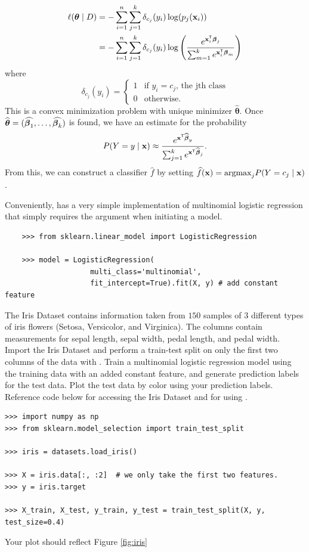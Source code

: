 \begin{align*}
    \ell(\boldsymbol{\theta}\mid D) 
    & = - \sum_{i=1}^n \sum_{j = 1}^k \delta_{c_j} (y_i) \log (p_j(\mathbf{x}_i)) \\
    & = - \sum_{i=1}^n \sum_{j = 1}^k \delta_{c_j} (y_i) \log \left(  \frac{e^{\mathbf{x}_i^\mathsf{T}\boldsymbol\beta_j}}{\sum_{m=1}^k e^{\mathbf{x}_i^\mathsf{T}\boldsymbol\beta_m}} \right)
\end{align*}
where 
\[
    \delta_{c_j} (y_i) = \begin{cases}
    1 & \text{if $y_i = c_j$, the jth class}\\
    0 & \text{otherwise}. 
    \end{cases}
\]
This is a convex minimization problem with unique minimizer $\widehat{\boldsymbol{\theta}}$.
Once $\widehat{\boldsymbol{\theta}} = (\widehat{\boldsymbol\beta_1},\dots, \widehat{\boldsymbol\beta_k})$ is found, we have an estimate for the probability
\[
    P(Y=y \mid \mathbf{x}) \approx \frac{e^{\mathbf{x}^\mathsf{T} \widehat{\boldsymbol\beta}_y}}{\sum_{j=1}^k e^{\mathbf{x}^\mathsf{T} \widehat{\boldsymbol\beta}_j}}.
\]
From this, we can construct a classifier $\widehat{f}$ by setting $\widehat{f}(\mathbf{x}) = \text{argmax}_j P(Y=c_j \mid \mathbf{x}) $.  

Conveniently,  has a very simple implementation of multinomial logistic regression that simply requires the argument  when initiating a  model.
\begin{lstlisting}
    >>> from sklearn.linear_model import LogisticRegression

    >>> model = LogisticRegression(
                    multi_class='multinomial',
                    fit_intercept=True).fit(X, y) # add constant feature
\end{lstlisting}


\begin{problem}
    The Iris Dataset contains information taken from $150$ samples of $3$ different types of iris flowers (Setosa, Versicolor, and Virginica).
    The columns contain measurements for sepal length, sepal width, pedal length, and pedal width.
    Import the Iris Dataset and perform a train-test split on only the first two columns of the data with .
    Train a multinomial logistic regression model using the training data with an added constant feature, and generate prediction labels for the test data.
    Plot the test data by color using your prediction labels.
    Reference code below for accessing the Iris Dataset and for using .
\begin{lstlisting}
>>> import numpy as np
>>> from sklearn.model_selection import train_test_split

>>> iris = datasets.load_iris()

>>> X = iris.data[:, :2]  # we only take the first two features.
>>> y = iris.target

>>> X_train, X_test, y_train, y_test = train_test_split(X, y, test_size=0.4)
\end{lstlisting}
    Your plot should reflect Figure \ref{fig:iris}
\end{problem}

